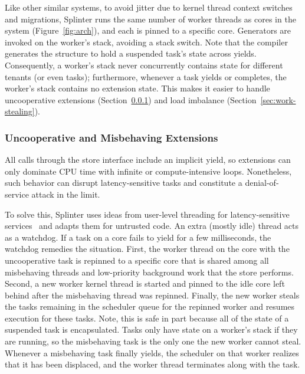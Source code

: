 
Like other similar systems, to avoid jitter due to kernel thread context
    switches and migrations, Splinter runs
    the same number of
  worker threads as cores in the system (Figure~\ref{fig:arch}), and each is
  pinned to a specific core.
Generators are invoked on the worker's stack, avoiding a stack switch.
Note that the compiler generates the structure to hold a suspended
  task's state across yields.
Consequently, a worker's stack never concurrently contains state for
  different tenants (or even tasks); furthermore, whenever a task
  yields or completes, the worker's stack contains no extension state.
This makes it easier to handle uncooperative extensions (Section~\ref{sec:uncoop})
  and load imbalance (Section~\ref{sec:work-stealing}).

\subsubsection{Uncooperative and Misbehaving Extensions}
\label{sec:uncoop}

All calls through the store interface include an implicit yield, so extensions
  can only dominate CPU time with infinite or compute-intensive loops.
Nonetheless, such behavior can disrupt latency-sensitive tasks and constitute a
  denial-of-service attack in the limit.

To solve this, Splinter uses ideas from user-level threading for
  latency-sensitive services~\cite{arachne-2018} and adapts them for
  untrusted code.
An extra (mostly idle) thread acts as a watchdog.
If a task on a core fails to yield for a few milliseconds, the watchdog
  remedies the situation.
First, the worker thread on the core with the uncooperative task is
  repinned to a specific core that is shared among all misbehaving threads
  and low-priority background work that the store performs.
Second, a new worker kernel thread is started and pinned to the idle core left behind
  after the misbehaving thread was repinned.
Finally, the new worker steals the tasks remaining in the scheduler queue for
  the repinned worker and resumes execution for these tasks.
Note, this is safe in part because all of the state of a suspended task is
  encapsulated.
Tasks only have state on a worker's stack if they are running, so
  the misbehaving task is the only one the new worker cannot steal.
Whenever a misbehaving task finally yields, the scheduler on that worker realizes
  that it has been displaced, and the worker thread terminates along with the task.


